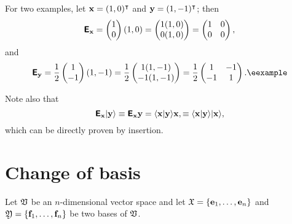 {
\color{blue}
\bexample
For two examples, let
${\bf x}=(1,0)^\intercal $
and
${\bf y}=(1,-1)^\intercal $;
then
$$
\textsf{\textbf{E}}_{\bf x}
=
\begin{pmatrix}
1\\
0
\end{pmatrix}
(1,0)
=
\begin{pmatrix}
1(1,0)\\
0(1,0)
\end{pmatrix}
=
\begin{pmatrix}
1&0\\
0&0
\end{pmatrix}
,
$$
and
$$
\textsf{\textbf{E}}_{\bf y}
= \frac{1}{2}
\begin{pmatrix}
1\\
-1
\end{pmatrix}
(1,-1)
= \frac{1}{2}
\begin{pmatrix}
1(1,-1)\\
-1(1,-1)
\end{pmatrix}
= \frac{1}{2}
\begin{pmatrix}
1&-1\\
-1&1
\end{pmatrix}
.
\textrm{\eexample}
$$
}

Note also that
\begin{equation}
\textsf{\textbf{E}}_{\bf x} \vert {\bf y}\rangle
\equiv
\textsf{\textbf{E}}_{\bf x} {\bf y}
=
\langle {\bf x}\vert  {\bf y} \rangle {\bf x},
\equiv
\langle {\bf x}\vert  {\bf y} \rangle \vert {\bf x}\rangle ,
\end{equation}
which can be directly proven by insertion.







\section{Change of basis}
\label{2012-m-ch-fdlvs-changeofbasis}

Let ${\frak V}$ be an $n$-dimensional vector space and let
${\frak X}
=
\{
{\bf e}_1,
\ldots ,
{\bf e}_n
\}$
and
${\frak Y}
=  \{
{\bf f}_1,
\ldots ,
{\bf f}_n
\}$ be two bases of ${\frak V}$.

